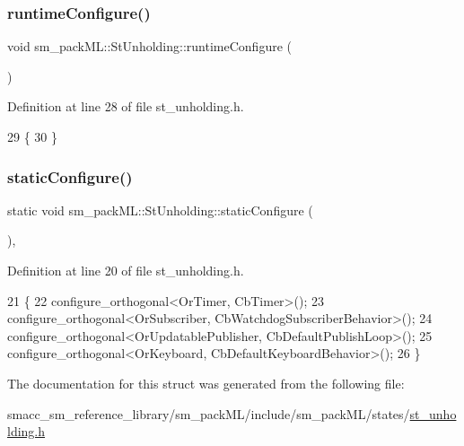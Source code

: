 \subsubsection{\texorpdfstring{runtime\+Configure()}{runtimeConfigure()}}
{\footnotesize\ttfamily void sm\+\_\+pack\+M\+L\+::\+St\+Unholding\+::runtime\+Configure (\begin{DoxyParamCaption}{ }\end{DoxyParamCaption})\hspace{0.3cm}{\ttfamily [inline]}}



Definition at line 28 of file st\+\_\+unholding.\+h.


\begin{DoxyCode}
29     \{
30     \}
\end{DoxyCode}
\mbox{\label{structsm__packML_1_1StUnholding_af10ed2a8a3468eeff32c4466544c7efa}} 
\subsubsection{\texorpdfstring{static\+Configure()}{staticConfigure()}}
{\footnotesize\ttfamily static void sm\+\_\+pack\+M\+L\+::\+St\+Unholding\+::static\+Configure (\begin{DoxyParamCaption}{ }\end{DoxyParamCaption})\hspace{0.3cm}{\ttfamily [inline]}, {\ttfamily [static]}}



Definition at line 20 of file st\+\_\+unholding.\+h.


\begin{DoxyCode}
21     \{
22         configure\_orthogonal<OrTimer, CbTimer>();   
23         configure\_orthogonal<OrSubscriber, CbWatchdogSubscriberBehavior>();
24         configure\_orthogonal<OrUpdatablePublisher, CbDefaultPublishLoop>();
25         configure\_orthogonal<OrKeyboard, CbDefaultKeyboardBehavior>();
26     \}
\end{DoxyCode}


The documentation for this struct was generated from the following file\+:\begin{DoxyCompactItemize}
\item 
smacc\+\_\+sm\+\_\+reference\+\_\+library/sm\+\_\+pack\+M\+L/include/sm\+\_\+pack\+M\+L/states/\hyperlink{st__unholding_8h}{st\+\_\+unholding.\+h}\end{DoxyCompactItemize}
